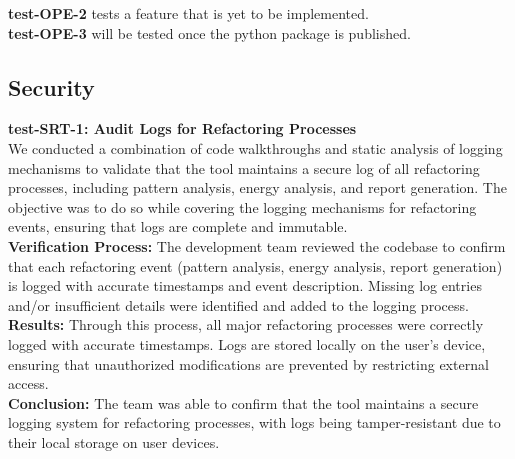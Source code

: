\documentclass[12pt, titlepage]{article}
\begin{document}
\noindent
\textbf{test-OPE-2} tests a feature that is yet to be implemented. \\[2mm]

\noindent
\textbf{test-OPE-3} will be tested once the python package is published.

\subsection{Security}

\textbf{test-SRT-1: Audit Logs for Refactoring Processes} \\[2mm]
We conducted a combination of code walkthroughs and static analysis
of logging mechanisms to validate that the tool maintains a secure
log of all refactoring processes, including pattern analysis, energy
analysis, and report generation. The objective was to do so while
covering the logging mechanisms for refactoring events, ensuring that
logs are complete and immutable.\\

\noindent \textbf{Verification Process:} The development team reviewed the codebase to confirm that
each refactoring event (pattern analysis, energy analysis, report
generation) is logged with accurate timestamps and event description.
Missing log entries and/or insufficient details were identified and
added to the logging process.\\

\noindent \textbf{Results:} Through this process, all major refactoring processes were
correctly logged with accurate timestamps. Logs are stored locally on
the user's device, ensuring that unauthorized modifications are
prevented by restricting external access.\\

\noindent \textbf{Conclusion:} The team was able to confirm that the tool maintains a
secure logging system for refactoring processes, with logs being
tamper-resistant due to their local storage on user devices.
\end{document}
